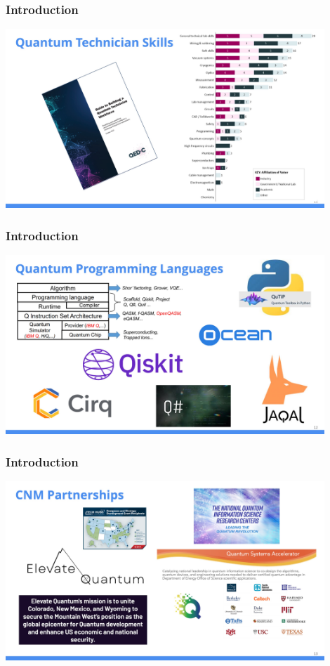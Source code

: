 \documentclass{beamer}
\begin{document}
\begin{frame}\frametitle{Introduction}
\begin{center}
\includegraphics[width=12cm]{fig/Slide11.jpeg}
\end{center}
\end{frame}

\begin{frame}\frametitle{Introduction}
\begin{center}
\includegraphics[width=12cm]{fig/Slide12.jpeg}
\end{center}
\end{frame}

\begin{frame}\frametitle{Introduction}
\begin{center}
\includegraphics[width=12cm]{fig/Slide13.jpeg}
\end{center}
\end{frame}
\end{document}
